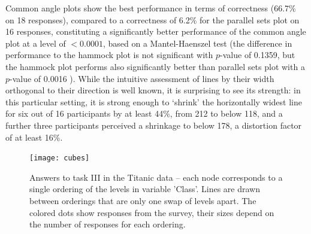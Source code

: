 %
Common angle plots show the best performance in terms of correctness (66.7\% on 18 responses), compared to a correctness of 6.2\% for the parallel sets plot on 16 responses, constituting a significantly better performance of the  common angle plot at a level of $< 0.0001$, based on a Mantel-Haenszel test (the difference in performance to the hammock plot is not significant with $p$-value of 0.1359, but the hammock plot performs also significantly better than parallel sets plot with a $p$-value of 0.0016 ).
While the intuitive assessment of lines by their width orthogonal to their direction is well known, it is surprising to see its strength: in this particular setting, it is strong enough to `shrink' the horizontally widest line for six out of 16 participants by at least  44\%, from 212 to below 118, and a further three participants perceived a  shrinkage to below 178,  a distortion factor of at least 16\%.

\begin{figure}
\texttt{[image: cubes]}
\caption{Answers to task III in the Titanic data -- each node corresponds to a single ordering of the levels in variable 'Class'. Lines are drawn between orderings that are only one swap of levels apart. The colored dots show responses from the survey, their sizes depend on the number of responses for each ordering. }
\label{cubes}
\end{figure}



